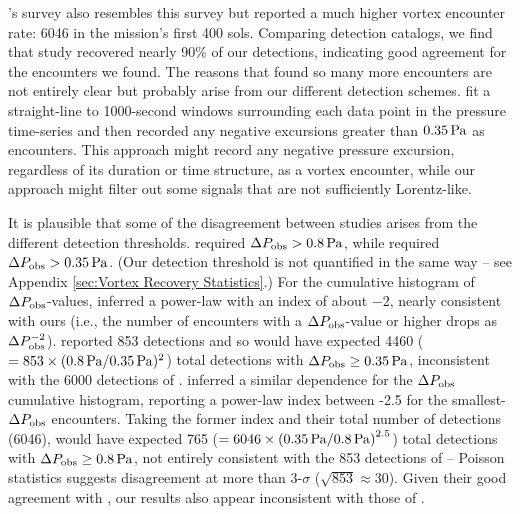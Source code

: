 \documentclass[linenumbers,trackchanges]{aastex63}
\begin{document}
\citet{2021JGRE..12606511S}'s survey also resembles this survey but reported a much higher vortex encounter rate: 6046 in the mission's first 400 sols. Comparing detection catalogs, we find that study recovered nearly 90\% of our detections, indicating good agreement for the encounters we found. The reasons that \citet{2021JGRE..12606511S} found so many more encounters are not entirely clear but probably arise from our different detection schemes. \citet{2021JGRE..12606511S} fit a straight-line to 1000-second windows surrounding each data point in the pressure time-series and then recorded any negative excursions greater than $0.35\,{\rm Pa}$ as encounters. This approach might record any negative pressure excursion, regardless of its duration or time structure, as a vortex encounter, while our approach might filter out some signals that are not sufficiently Lorentz-like. 

It is plausible that some of the disagreement between studies arises from the different detection thresholds. \citet{2021Icar..35514119L} required $\Delta P_{\rm obs} > 0.8\,{\rm Pa}$, while \citet{2021JGRE..12606511S} required $\Delta P_{\rm obs} > 0.35\,{\rm Pa}$. (Our detection threshold is not quantified in the same way -- see Appendix \ref{sec:Vortex Recovery Statistics}.) For the cumulative histogram of $\Delta P_{\rm obs}$-values, \citet{2021Icar..35514119L} inferred a power-law with an index of about $-2$, nearly consistent with ours (i.e., the number of encounters with a $\Delta P_{\rm obs}$-value or higher drops as $\Delta P_{\rm obs}^{-2}$). \citet{2021Icar..35514119L} reported 853 detections and so would have expected 4460 ($= 853 \times (0.8\,{\rm Pa}/0.35\,{\rm Pa})^2$) total detections with $\Delta P_{\rm obs} \geq 0.35\,{\rm Pa}$, inconsistent with the 6000 detections of \citet{2021JGRE..12606511S}. \citet{2021JGRE..12606511S} inferred a similar dependence for the $\Delta P_{\rm obs}$ cumulative histogram, reporting a power-law index between -2.5 for the smallest-$\Delta P_{\rm obs}$ encounters. Taking the former index and their total number of detections (6046), \citet{2021JGRE..12606511S} would have expected 765 ($= 6046 \times \left(0.35\,{\rm Pa}/0.8\,{\rm Pa} \right)^{2.5}$) total detections with $\Delta P_{\rm obs} \geq 0.8\,{\rm Pa}$, not entirely consistent with the 853 detections of \citet{2021Icar..35514119L} -- Poisson statistics suggests disagreement at more than 3-$\sigma$ ($\sqrt{853} \approx 30$). Given their good agreement with \citet{2021Icar..35514119L}, our results also appear inconsistent with those of \citet{2021JGRE..12606511S}.
\end{document}
